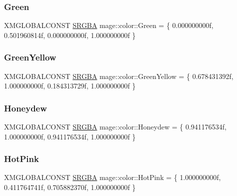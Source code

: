 \hypertarget{namespacemage_1_1color_a48245bb6b463e921fdedd693650ea3ee}{}\label{namespacemage_1_1color_a48245bb6b463e921fdedd693650ea3ee} 
\subsubsection{\texorpdfstring{Green}{Green}}
{\footnotesize\ttfamily X\+M\+G\+L\+O\+B\+A\+L\+C\+O\+N\+ST \hyperlink{structmage_1_1_s_r_g_b_a}{S\+R\+G\+BA} mage\+::color\+::\+Green = \{ 0.\+000000000f, 0.\+501960814f, 0.\+000000000f, 1.\+000000000f \}}

\hypertarget{namespacemage_1_1color_a4158cbb67c02d4bf319e9dbfba31ad89}{}\label{namespacemage_1_1color_a4158cbb67c02d4bf319e9dbfba31ad89} 
\subsubsection{\texorpdfstring{Green\+Yellow}{GreenYellow}}
{\footnotesize\ttfamily X\+M\+G\+L\+O\+B\+A\+L\+C\+O\+N\+ST \hyperlink{structmage_1_1_s_r_g_b_a}{S\+R\+G\+BA} mage\+::color\+::\+Green\+Yellow = \{ 0.\+678431392f, 1.\+000000000f, 0.\+184313729f, 1.\+000000000f \}}

\hypertarget{namespacemage_1_1color_ae1e6093bc57e79aebccc1c84672b5578}{}\label{namespacemage_1_1color_ae1e6093bc57e79aebccc1c84672b5578} 
\subsubsection{\texorpdfstring{Honeydew}{Honeydew}}
{\footnotesize\ttfamily X\+M\+G\+L\+O\+B\+A\+L\+C\+O\+N\+ST \hyperlink{structmage_1_1_s_r_g_b_a}{S\+R\+G\+BA} mage\+::color\+::\+Honeydew = \{ 0.\+941176534f, 1.\+000000000f, 0.\+941176534f, 1.\+000000000f \}}

\hypertarget{namespacemage_1_1color_a808d0811878ca1e06f8ff11cfafdfd3a}{}\label{namespacemage_1_1color_a808d0811878ca1e06f8ff11cfafdfd3a} 
\subsubsection{\texorpdfstring{Hot\+Pink}{HotPink}}
{\footnotesize\ttfamily X\+M\+G\+L\+O\+B\+A\+L\+C\+O\+N\+ST \hyperlink{structmage_1_1_s_r_g_b_a}{S\+R\+G\+BA} mage\+::color\+::\+Hot\+Pink = \{ 1.\+000000000f, 0.\+411764741f, 0.\+705882370f, 1.\+000000000f \}}

